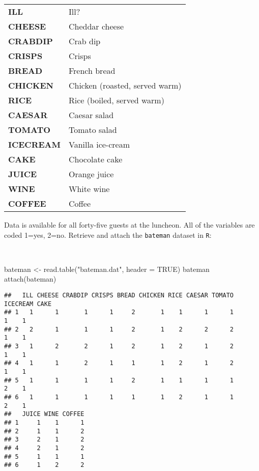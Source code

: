\documentclass[
  12pt,
  a4paper]{book}
\newenvironment{Shaded}{\begin{snugshade}}{\end{snugshade}}
\newcommand{\AttributeTok}[1]{\textcolor[rgb]{0.77,0.63,0.00}{#1}}
\newcommand{\ConstantTok}[1]{\textcolor[rgb]{0.00,0.00,0.00}{#1}}
\newcommand{\FunctionTok}[1]{\textcolor[rgb]{0.00,0.00,0.00}{#1}}
\newcommand{\NormalTok}[1]{#1}
\newcommand{\OtherTok}[1]{\textcolor[rgb]{0.56,0.35,0.01}{#1}}
\newcommand{\StringTok}[1]{\textcolor[rgb]{0.31,0.60,0.02}{#1}}
\begin{document}
\begin{longtable}[]{@{}
  >{\raggedright\arraybackslash}p{}
  >{\raggedright\arraybackslash}p{}@{}}
\toprule
\endhead
\textbf{ILL} & Ill? \\
\textbf{CHEESE} & Cheddar cheese \\
\textbf{CRABDIP} & Crab dip \\
\textbf{CRISPS} & Crisps \\
\textbf{BREAD} & French bread \\
\textbf{CHICKEN} & Chicken (roasted, served warm) \\
\textbf{RICE} & Rice (boiled, served warm) \\
\textbf{CAESAR} & Caesar salad \\
\textbf{TOMATO} & Tomato salad \\
\textbf{ICECREAM} & Vanilla ice-cream \\
\textbf{CAKE} & Chocolate cake \\
\textbf{JUICE} & Orange juice \\
\textbf{WINE} & White wine \\
\textbf{COFFEE} & Coffee \\
\bottomrule
\end{longtable}

\newpage

Data is available for all forty-five guests at the luncheon. All of the variables are coded 1=yes, 2=no. Retrieve and attach the \texttt{bateman} dataset in \texttt{R}:

~

\begin{Shaded}
\begin{Highlighting}[]
\NormalTok{bateman }\OtherTok{\textless{}{-}} \FunctionTok{read.table}\NormalTok{(}\StringTok{"bateman.dat"}\NormalTok{, }\AttributeTok{header =} \ConstantTok{TRUE}\NormalTok{)}
\NormalTok{bateman}
\FunctionTok{attach}\NormalTok{(bateman)}
\end{Highlighting}
\end{Shaded}

\begin{verbatim}
##   ILL CHEESE CRABDIP CRISPS BREAD CHICKEN RICE CAESAR TOMATO ICECREAM CAKE
## 1   1      1       1      1     2       1    1      1      1        1    1
## 2   2      1       1      1     2       1    2      2      2        1    1
## 3   1      2       2      1     2       1    2      1      2        1    1
## 4   1      1       2      1     1       1    2      1      2        1    1
## 5   1      1       1      1     2       1    1      1      1        2    1
## 6   1      1       1      1     1       1    2      1      1        2    1
##   JUICE WINE COFFEE
## 1     1    1      1
## 2     1    1      2
## 3     2    1      2
## 4     2    1      2
## 5     1    1      1
## 6     1    2      2
\end{verbatim}
\end{document}
